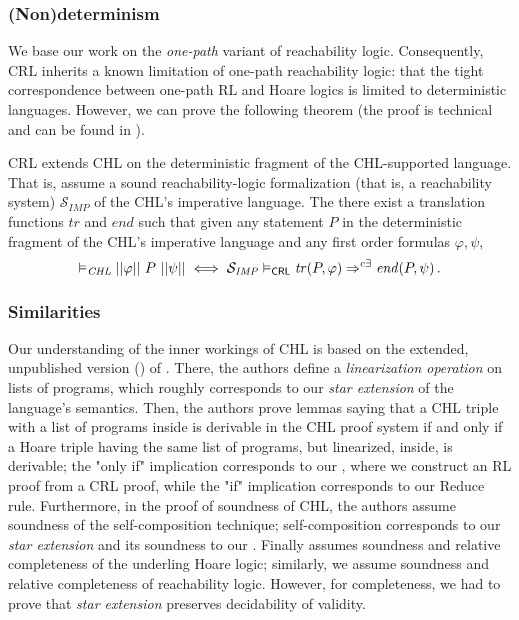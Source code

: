 \subsubsection{(Non)determinism}
We base our work on the \emph{one-path} variant of reachability logic.
Consequently, CRL inherits a known limitation of one-path reachability logic: that the tight correspondence between
one-path RL and Hoare logics is limited to deterministic languages.
However, we can prove the following theorem (the proof is technical and can be found in ).
\begin{theorem}\label{thm:chlCRLrelation}
  CRL extends CHL on the deterministic fragment of the CHL-supported language.
  That is, assume a sound reachability-logic formalization (that is, a reachability system) $\mathcal{S}_{\mathit{IMP}}$ of the CHL's imperative language.
  The there exist a translation functions $\mathit{tr}$ and $\mathit{end}$ such that
  given any statement $P$ in the deterministic fragment of the CHL's imperative language
  and any first order formulas $\varphi, \psi$,
  \begin{equation*}
    \vDash_{\mathit{CHL}} ||\varphi||\ P\ ||\psi||
    \iff
    \mathcal{S}_{\mathit{IMP}} \vDash_\CRL \mathit{tr}(P, \varphi) \Rightarrow^{c\exists} \mathit{end}(P, \psi) \, .
  \end{equation*}
\end{theorem}


\subsubsection{Similarities}

Our understanding of the inner workings of CHL is based on the extended, unpublished version (\cite{SousaD16Extended})
of \cite{SousaD16}.
There, the authors define a \emph{linearization operation} on lists of programs, which roughly corresponds to our
\emph{star extension} of the language's semantics.
Then, the authors prove lemmas saying that a CHL triple with a list of programs inside is derivable
in the CHL proof system
if and only if 
a Hoare triple having the same list of programs, but linearized, inside, is derivable;
the "only if" implication corresponds to our , where we construct
an RL proof from a CRL proof,
while the "if" implication corresponds to our Reduce rule.
Furthermore, in the proof of soundness of CHL, the authors assume soundness of the self-composition technique;
self-composition corresponds to our \emph{star extension} and its soundness to our .
Finally \cite{SousaD16Extended} assumes soundness and relative completeness of the underling Hoare logic;
similarly, we assume soundness and relative completeness of reachability logic.
However, for completeness, we had to prove that \emph{star extension} preserves decidability of validity.


